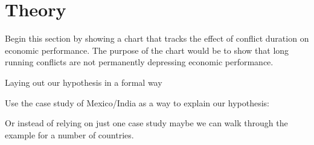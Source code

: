 \section{Theory}
\label{theory}

Begin this section by showing a chart that tracks the effect of conflict duration on economic performance. The purpose of the chart would be to show that long running conflicts are not permanently depressing economic performance. 

Laying out our hypothesis in a formal way

	Use the case study of Mexico/India as a way to explain our hypothesis: 

	Or instead of relying on just one case study maybe we can walk through the example for a number of countries.